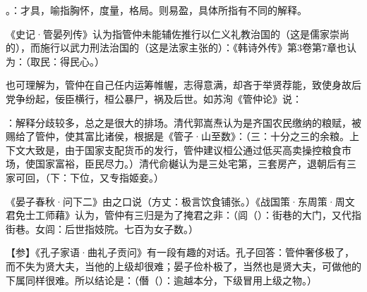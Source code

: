 {
\item {}。：才具，喻指胸怀，度量，格局。则易盈，具体所指有不同的解释。

《史记·管晏列传》认为指管仲未能辅佐推行以仁义礼教治国的（这是儒家崇尚的），而施行以武力刑法治国的（这是法家主张的）：《韩诗外传》第3卷第7章也认为：（取民：得民心。）

也可理解为，管仲在自己任内运筹帷幄，志得意满，却吝于举贤荐能，致使身故后党争纷起，佞臣横行，桓公暴尸，祸及后世。如苏洵《管仲论》说：

\item {}：解释分歧较多，总之是很大的排场。清代郭嵩焘认为是齐国农民缴纳的粮赋，被赐给了管仲，使其富比诸侯，根据是《管子·山至数》：（三：十分之三的余粮。上下文大致是，由于国家支配货币的发行，管仲建议桓公通过低买高卖操控粮食市场，使国家富裕，臣民尽力。）清代俞樾认为是三处宅第，三套房产，退朝后有三家可回，（下：下位，又专指姬妾。）

《晏子春秋·问下二》由之口说（方丈：极言饮食铺张。）《战国策·东周策·周文君免士工师藉》认为，管仲有三归是为了掩君之非：（闾（）：街巷的大门，又代指街巷。女闾：后世指妓院。七百为女子数。）

【参】《孔子家语·曲礼子贡问》有一段有趣的对话。孔子回答：管仲奢侈极了，而不失为贤大夫，当他的上级却很难；晏子俭朴极了，当然也是贤大夫，可做他的下属同样很难。所以结论是：（僭（）：逾越本分，下级冒用上级之物。）

}
